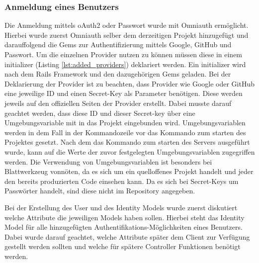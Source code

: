\subsubsection{Anmeldung eines Benutzers}
\label{sec: sign-in-imp}
Die Anmeldung mittels oAuth2 oder Passwort wurde mit Omniauth ermöglicht. Hierbei wurde zuerst Omniauth selber dem derzeitigen Projekt hinzugefügt und darauffolgend die Gems zur Authentifizierung mittels Google, GitHub und Passwort. Um die einzelnen Provider nutzen zu können müssen diese in einem initializer (Listing \ref{lst:added_providers}) deklariert werden. Ein initializer wird nach dem Rails Framework und den dazugehörigen Gems geladen. Bei der Deklarierung der Provider ist zu beachten, dass Provider wie Google oder GitHub eine jeweilige ID und einen Secret-Key als Parameter benötigen. Diese werden jeweils auf den offiziellen Seiten der Provider erstellt. Dabei musste darauf geachtet werden, dass diese ID und dieser Secret-key über eine Umgebungsvariable mit in das Projekt eingebunden wird. Umgebungsvariablen werden in dem Fall in der Kommandozeile vor das Kommando zum starten des Projektes gesetzt. Nach dem das Kommando zum starten des Servers ausgeführt wurde, kann auf die Werte der zuvor festgelegten Umgebungsvariablen zugegriffen werden. Die Verwendung von Umgebungsvariablen ist besonders bei Blattwerkzeug vonnöten, da es sich um ein quelloffenes Projekt handelt und jeder den bereits produzierten Code einsehen kann. Da es sich bei Secret-Keys um Passwörter handelt, sind diese nicht im Repository angegeben.  




Bei der Erstellung des User und des Identity Models wurde zuerst diskutiert welche Attribute die jeweiligen Models haben sollen. Hierbei steht das Identity Model für alle hinzugefügten Authentifikations-Möglichkeiten eines Benutzers. Dabei wurde darauf geachtet, welche Attribute später dem Client zur Verfügung gestellt werden sollten und welche für spätere Controller Funktionen benötigt werden.

